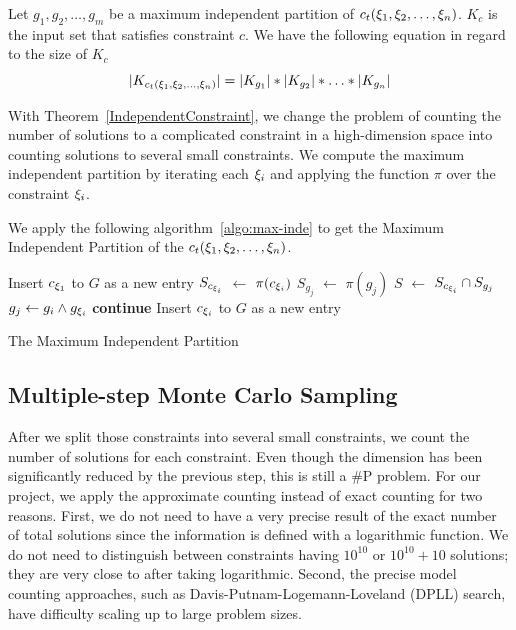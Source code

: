 \begin{theorem}
    \label{IndependentConstraint}
    Let $g_{1}, g_{2}, \ldots, g_{m}$ be a maximum independent partition of
    $c_t({\xi}_{1},{\xi}_{2},\ldots,{\xi}_{n})$.
    $K_c$ is the input set that satisfies constraint $c$. We have the following
    equation in regard to the size of $K_c$
    $$|K_{c_t({\xi}_{1},{\xi}_{2},\ldots,{\xi}_{n})}| = |K_{g_{1}}|*|K_{g_{2}}|*\ldots*|K_{g_{n}}|$$
\end{theorem}
With Theorem~\ref{IndependentConstraint}, we change the problem of counting the number of solutions to a complicated constraint in a high-dimension
space into counting solutions to several small constraints. We compute the maximum independent partition by iterating each ${\xi}_{i}$ and applying the function $\pi$ over the constraint ${\xi}_{i}$.

We apply the following
algorithm~\ref{algo:max-inde} to get the Maximum Independent Partition of the
$c_t({\xi}_{1},{\xi}_{2},\ldots,{\xi}_{n})$.


\IncMargin{1em}
\begin{algorithm}[th]\small
    \DontPrintSemicolon
    Insert $c_{{\xi}_{1}}$ to $G$ as a new entry \;
    {
        $S_{c_{{\xi}_{i}}}$ $\leftarrow$ $\pi(c_{{\xi}_{i}})$ \;
        {
            $S_{g_j}$ $\leftarrow$ $\pi(g_{j})$ \;
            $S$ $\leftarrow$ $S_{c_{{\xi}_{i}}} \cap S_{g_j}$  \;
            {
                $g_{j} \leftarrow g_{i} \land g_{{\xi}_{i}}$ \;
                \textbf{continue} \;
            }
            Insert $c_{{\xi}_{i}}$ to $G$ as a new entry \;
        }
    }
    \caption{The Maximum Independent Partition}
    \label{algo:max-inde}
\end{algorithm}
\DecMargin{1em}


\subsection{Multiple-step Monte Carlo Sampling}

After we split those constraints into several small constraints, we count the number of solutions for each constraint. Even though the dimension has been
significantly reduced by the previous step, this is still a \#P problem. For our project, we apply the approximate counting instead of exact counting for two reasons. First, we do not need to have a very precise result of the exact number of total solutions since the information is defined with a logarithmic function. We do not need to distinguish between constraints having $10^{10}$ or $10^{10} + 10$ solutions; they are very close to after taking logarithmic. Second, the
precise model counting approaches, such as Davis-Putnam-Logemann-Loveland (DPLL)
search, have difficulty scaling up to large problem sizes.

